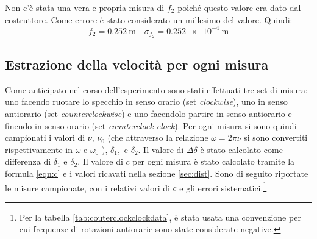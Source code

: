 \documentclass[a4paper,11pt]{article}
\begin{document}
	Non c'è stata una vera e propria misura di $ f_2 $ poiché questo valore era dato dal costruttore. Come errore è stato considerato un millesimo del valore. Quindi:
	\[ 
	f_2 = \SI{0.252}{\meter} \quad \sigma_{f_2}=\SI{0.252 e-4}{\meter}
	\]
	\subsection{Estrazione della velocità per ogni misura}
	Come anticipato nel corso dell'esperimento sono stati effettuati tre set di misura: uno facendo ruotare lo specchio in senso orario (set \emph{clockwise}), uno in senso antiorario (set \emph{counterclockwise}) e uno facendolo partire in senso antiorario e finendo in senso orario (set \emph{counterclock-clock}). Per ogni misura si sono quindi campionati i valori di $ \nu,\, \nu_0$ (che attraverso la relazione $ \omega=2\pi\nu $ si sono convertiti rispettivamente in $ \omega $ e $ \omega_0 $ ), $\delta_1, $ e $ \delta_2 $. Il valore di $ \Delta\delta $ è stato calcolato come differenza di $ \delta_1 $ e $ \delta_2 $. Il valore di $ c $ per ogni misura è stato calcolato tramite la formula \ref{eqn:c} e i valori ricavati nella sezione \ref{sec:dist}. Sono di seguito riportate le misure campionate, con i relativi valori di $ c $ e gli errori sistematici.\footnote{Per la tabella \ref{tab:couterclockclockdata}, è stata usata una convenzione per cui frequenze di rotazioni antiorarie sono state considerate negative.}
	
\end{document}
